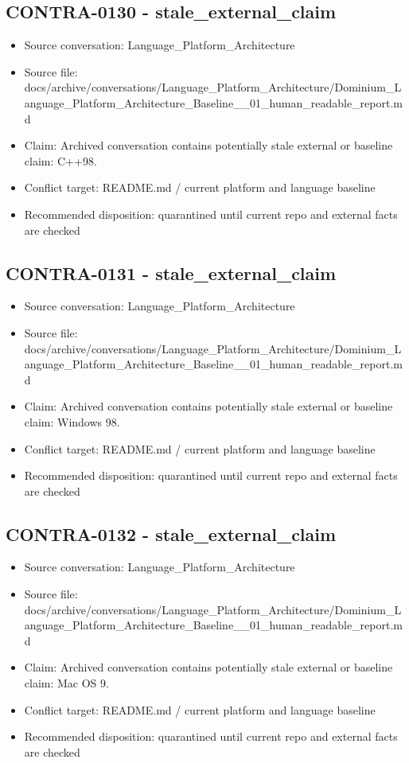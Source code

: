 \documentclass[11pt,a4paper]{report}
\begin{document}
\subsection{CONTRA-0130 - stale\_external\_claim}

\begin{itemize}
\item Source conversation: Language\_Platform\_Architecture
\item Source file: docs/archive/conversations/Language\_Platform\_Architecture/Dominium\_Language\_Platform\_Architecture\_Baseline\_\_01\_human\_readable\_report.md
\item Claim: Archived conversation contains potentially stale external or baseline claim: C++98.
\item Conflict target: README.md / current platform and language baseline
\item Recommended disposition: quarantined until current repo and external facts are checked
\end{itemize}

\subsection{CONTRA-0131 - stale\_external\_claim}

\begin{itemize}
\item Source conversation: Language\_Platform\_Architecture
\item Source file: docs/archive/conversations/Language\_Platform\_Architecture/Dominium\_Language\_Platform\_Architecture\_Baseline\_\_01\_human\_readable\_report.md
\item Claim: Archived conversation contains potentially stale external or baseline claim: Windows 98.
\item Conflict target: README.md / current platform and language baseline
\item Recommended disposition: quarantined until current repo and external facts are checked
\end{itemize}

\subsection{CONTRA-0132 - stale\_external\_claim}

\begin{itemize}
\item Source conversation: Language\_Platform\_Architecture
\item Source file: docs/archive/conversations/Language\_Platform\_Architecture/Dominium\_Language\_Platform\_Architecture\_Baseline\_\_01\_human\_readable\_report.md
\item Claim: Archived conversation contains potentially stale external or baseline claim: Mac OS 9.
\item Conflict target: README.md / current platform and language baseline
\item Recommended disposition: quarantined until current repo and external facts are checked
\end{itemize}
\end{document}
